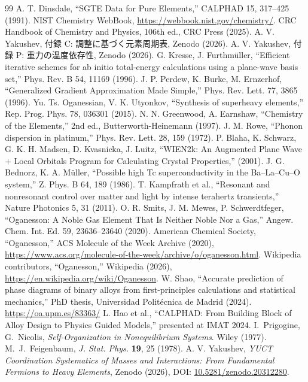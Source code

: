 \documentclass[11pt,a4paper]{article}
\begin{document}
	\begin{thebibliography}{99}
		 A. T. Dinsdale, ``SGTE Data for Pure Elements,'' CALPHAD 15, 317–425 (1991).
		 NIST Chemistry WebBook, \url{https://webbook.nist.gov/chemistry/}.
		 CRC Handbook of Chemistry and Physics, 106th ed., CRC Press (2025).
		 A. V. Yakushev, 付録 C: 調整に基づく元素周期表, Zenodo (2026).
		 A. V. Yakushev, 付録 P: 重力の温度依存性, Zenodo (2026).
		 G. Kresse, J. Furthmüller, ``Efficient iterative schemes for ab initio total-energy calculations using a plane-wave basis set,'' Phys. Rev. B 54, 11169 (1996).
		 J. P. Perdew, K. Burke, M. Ernzerhof, ``Generalized Gradient Approximation Made Simple,'' Phys. Rev. Lett. 77, 3865 (1996).
		 Yu. Ts. Oganessian, V. K. Utyonkov, ``Synthesis of superheavy elements,'' Rep. Prog. Phys. 78, 036301 (2015).
		 N. N. Greenwood, A. Earnshaw, ``Chemistry of the Elements,'' 2nd ed., Butterworth-Heinemann (1997).
		 J. M. Rowe, ``Phonon dispersion in platinum,'' Phys. Rev. Lett. 28, 159 (1972).
		 P. Blaha, K. Schwarz, G. K. H. Madsen, D. Kvasnicka, J. Luitz, ``WIEN2k: An Augmented Plane Wave + Local Orbitals Program for Calculating Crystal Properties,'' (2001).
		 J. G. Bednorz, K. A. Müller, ``Possible high Tc superconductivity in the Ba–La–Cu–O system,'' Z. Phys. B 64, 189 (1986).
		 T. Kampfrath et al., ``Resonant and nonresonant control over matter and light by intense terahertz transients,'' Nature Photonics 5, 31 (2011).
		 O. R. Smits, J. M. Mewes, P. Schwerdtfeger, ``Oganesson: A Noble Gas Element That Is Neither Noble Nor a Gas,'' Angew. Chem. Int. Ed. 59, 23636–23640 (2020).
		 American Chemical Society, ``Oganesson,'' ACS Molecule of the Week Archive (2020), \url{https://www.acs.org/molecule-of-the-week/archive/o/oganesson.html}.
		 Wikipedia contributors, ``Oganesson,'' Wikipedia (2026), \url{https://en.wikipedia.org/wiki/Oganesson}.
		 W. Shao, ``Accurate prediction of phase diagrams of binary alloys from first-principles calculations and statistical mechanics,'' PhD thesis, Universidad Politécnica de Madrid (2024). \url{https://oa.upm.es/83363/}
		 L. Hao et al., ``CALPHAD: From Building Block of Alloy Design to Physics Guided Models,'' presented at IMAT 2024.
		 I.~Prigogine, G.~Nicolis, \emph{Self-Organization in Nonequilibrium Systems}. Wiley (1977).
		 M.~J.~Feigenbaum, \emph{J. Stat. Phys.} \textbf{19}, 25 (1978).
		 A. V. Yakushev, \emph{YUCT Coordination Systematics of Masses and Interactions: From Fundamental Fermions to Heavy Elements}, Zenodo (2026), DOI: \href{https://doi.org/10.5281/zenodo.20312280}{10.5281/zenodo.20312280}.
	\end{thebibliography}
	
\end{document}
